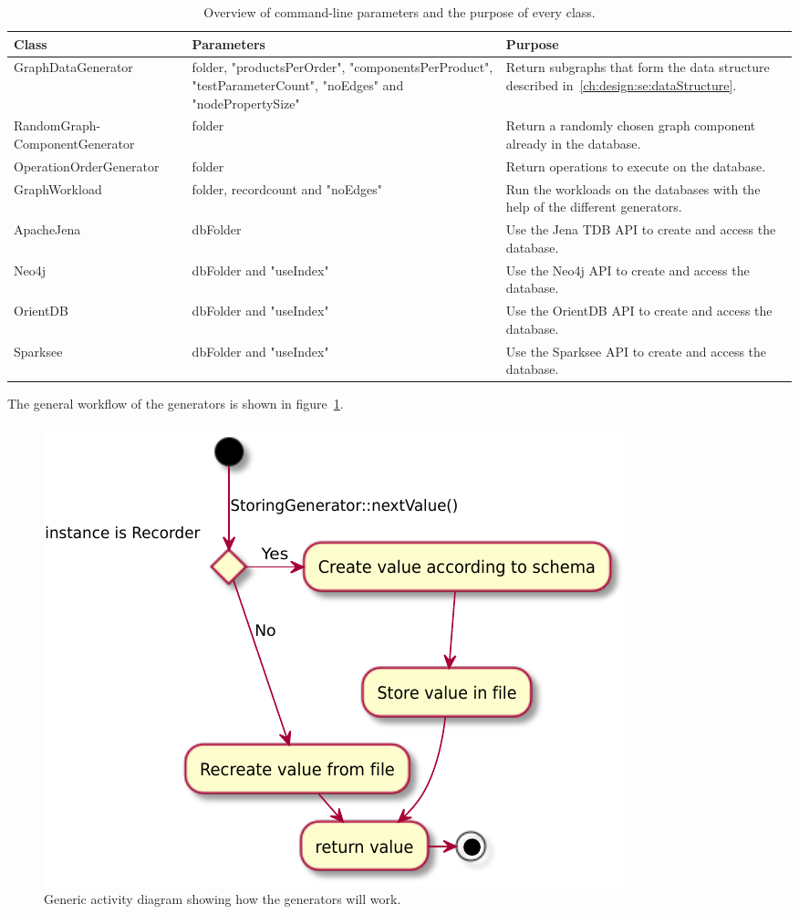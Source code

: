 \begin{table}[h!]
  \begin{minipage}{\textwidth}
    \begin{tabularx}{\textwidth}{ | X | X | X | }
      \hline
      Class & Parameters & Purpose \\ \hline
      GraphDataGenerator & folder, "productsPerOrder", "componentsPerProduct", "testParameterCount", "noEdges" and "nodePropertySize" & Return subgraphs that form the data structure described in~\ref{ch:design:se:dataStructure}. \\ \hline
      RandomGraph-\newline ComponentGenerator & folder & Return a randomly chosen graph component already in the database. \\ \hline
      OperationOrderGenerator & folder & Return operations to execute on the database. \\ \hline
      GraphWorkload & folder, recordcount and "noEdges" & Run the workloads on the databases with the help of the different generators. \\ \hline
      ApacheJena & dbFolder & Use the Jena TDB API to create and access the database. \\ \hline
      Neo4j & dbFolder and "useIndex" & Use the Neo4j API to create and access the database. \\ \hline
      OrientDB & dbFolder and "useIndex" & Use the OrientDB API to create and access the database. \\ \hline
      Sparksee & dbFolder and "useIndex" & Use the Sparksee API to create and access the database. \\ \hline
    \end{tabularx}
  \end{minipage}
  \caption{Overview of command-line parameters and the purpose of every class.}
  \label{tab:designOverview}
\end{table}

The general workflow of the generators is shown in figure~\ref{fig:generalGeneratorWorkflow}.

\begin{figure}[h!]
  \centering
  \includegraphics[width=.75\textwidth]{images/extensions/generalGeneratorWorkflow}
  \caption{Generic activity diagram showing how the generators will work.}
  \label{fig:generalGeneratorWorkflow}
\end{figure}

